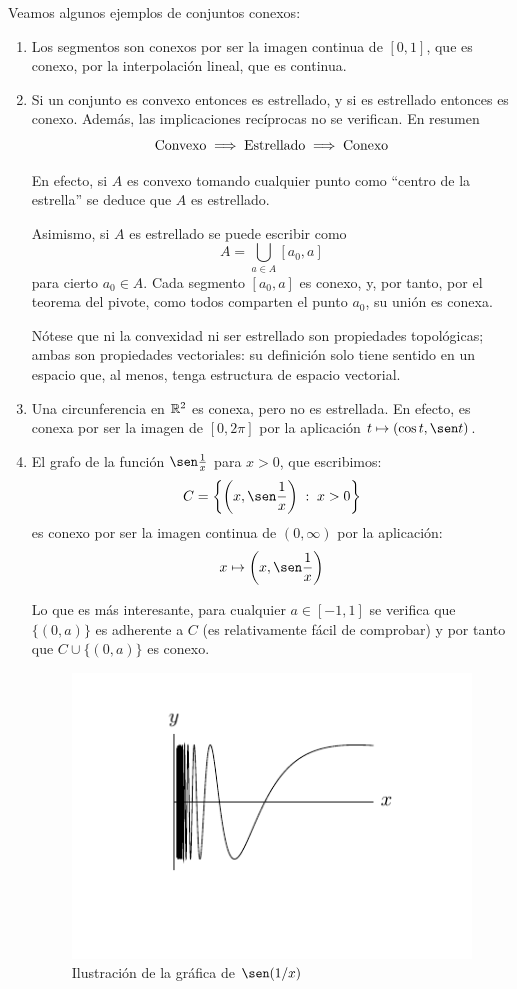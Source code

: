\begin{exa}[Miscelánea]
	\label{conex_exa_miscel}
	Veamos algunos ejemplos de conjuntos conexos:
	\begin{enumerate}
		\item Los segmentos son conexos por ser la imagen continua de $[0,1]$, que es conexo, por la interpolación lineal, que es continua.
		\item Si un conjunto es convexo entonces es estrellado, y si es estrellado entonces es conexo. Además, las implicaciones recíprocas no se verifican. En resumen
		\[\text{Convexo}\implies\text{Estrellado}\implies \text{Conexo}\]
		
		En efecto, si $A$ es convexo tomando cualquier punto como ``centro de la estrella'' se deduce que $A$ es estrellado.
		
		Asimismo, si $A$ es estrellado se puede escribir como
		\[A=\bigcup_{a\in A} [a_0, a]\]
		para cierto $a_0\in A$. Cada segmento $[a_0,a]$ es conexo, y, por tanto, por el teorema del pivote, como todos comparten el punto $a_0$, su unión es conexa.
		
		Nótese que ni la convexidad ni ser estrellado son propiedades topológicas; ambas son propiedades vectoriales: su definición solo tiene sentido en un espacio que, al menos, tenga estructura de espacio vectorial.
		
		\item Una circunferencia en $\mathbb{R}^2$ es conexa, pero no es estrellada. En efecto, es conexa por ser la imagen de $[0,2\pi]$ por la aplicación $t\mapsto (\cos t, \sen t)$.
		
		\item El grafo de la función $\sen\frac{1}{x}$ para $x>0$, que escribimos:
		\[C = \left\{\left(x,\sen\frac{1}{x}\right)\midc x>0\right\}\]
		es conexo por ser la imagen continua de $(0,\infty)$ por la aplicación:
		\[x\mapsto \left(x,\sen\frac{1}{x}\right)\]
		
		Lo que es más interesante, para cualquier $a\in [-1,1]$ se verifica que $\{(0,a)\}$ es adherente a $C$ (es relativamente fácil de comprobar) y por tanto que $C\cup\{(0,a)\}$ es conexo.
		\begin{figure}[H]
			\centering
			\includegraphics[scale = 0.8]{img/funcionsen1x}
			\caption{Ilustración de la gráfica de $\sen(1/x)$}
		\end{figure}
		

\end{enumerate}
\end{exa}
